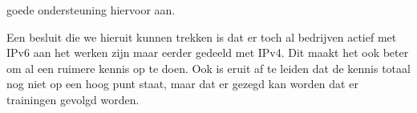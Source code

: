 goede ondersteuning hiervoor aan.

Een besluit die we hieruit kunnen trekken is dat er toch al bedrijven actief met IPv6 aan het werken zijn maar eerder gedeeld met IPv4. Dit maakt het ook beter om al een ruimere kennis op te doen. Ook is eruit af te leiden dat de kennis totaal nog niet op een hoog punt staat, maar dat er gezegd kan worden dat er trainingen gevolgd worden. 
